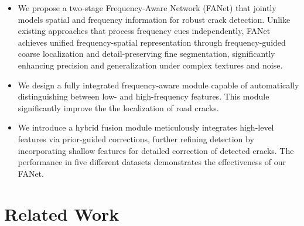 \documentclass[journal]{IEEEtran}
\begin{document}
\begin{itemize}
    
    
    \item We propose a two-stage Frequency-Aware Network (FANet) that jointly models spatial and frequency information for robust crack detection. 
    Unlike existing approaches that process frequency cues independently, FANet achieves unified frequency-spatial representation through frequency-guided coarse localization and detail-preserving fine segmentation, 
    significantly enhancing precision and generalization under complex textures and noise.

    \item We design a fully integrated frequency-aware module capable of automatically distinguishing between low- and high-frequency features. This module significantly improve the the localization of road cracks.
    
    \item We introduce a hybrid fusion module meticulously integrates high-level features via prior-guided corrections, further refining detection by incorporating shallow features for detailed correction of detected cracks. The performance in five different datasets demonstrates the effectiveness of our FANet.
    
\end{itemize}


\section{Related Work}\label{sec2}
\end{document}
